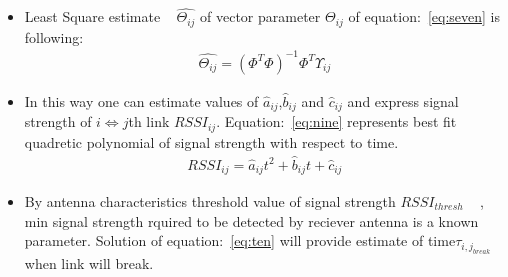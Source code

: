 \documentclass[runningheads]{llncs}
\begin{document}
\begin{enumerate}
\begin{itemize}
\begin{equation}
\begin{aligned}
\begin{matrix}
			\end{matrix} \right] , \varPhi_{ij} =\left[\begin{matrix} t^{2}_{m} & t_{m} & 1\\t^{2}_{m+1} & t_{m+1} & 1\\   \vdots & \vdots & \vdots\\t^{2}_{m+p} & t_{m+p} & 1 \\  \vdots & \vdots & \vdots  \\t^{2}_{m+n} & t_{m+n} & 1 \end{matrix} \right] ,       \varTheta _{ij}=\left[\begin{matrix}  a_{ij} \\ b_{ij} \\ c_{ij}\end{matrix} \right] 
			\end{aligned}\label{eq:eight}
			\end{equation} 
			\item Least Square estimate ~\cite{r17} $\hat{\varTheta_{ij}}$ of vector parameter $\varTheta _{ij}$ of equation:~\ref{eq:seven} is following: 
			\begin{equation}%
			\begin{aligned}
			\hat{\varTheta_{ij}}={(\varPhi^{T}\varPhi)}^{-1}\varPhi^{T}\varUpsilon_{ij}
			\end{aligned}\label{eq:eight}
			\end{equation} 
			\item In this way one can estimate values of $\hat{a}_{ij}$,$\hat{b}_{ij}$ and $\hat{c}_{ij}$ and express  signal strength  of $i\Leftrightarrow j$th link $RSSI_{ij}$. Equation:~\ref{eq:nine} represents best fit quadretic polynomial of signal strength with respect to time.
			\begin{equation}%
			\begin{aligned}
			RSSI_{ij} = \hat{a}_{ij} t^{2} + \hat{b}_{ij}t + \hat{c}_{ij}
			\end{aligned}\label{eq:nine}
			\end{equation}        
			\item By antenna characteristics threshold value of signal strength $RSSI_{thresh}$ ~\cite{r12} , min signal strength rquired  to be detected by reciever antenna is a known parameter. Solution of equation:~\ref{eq:ten} will provide estimate of time$\tau_{i,j_{break}}$ when link will break. 
			\begin{equation}%
			\begin{aligned}

\end{aligned}
\end{equation}
\end{itemize}
\end{enumerate}
\end{document}
